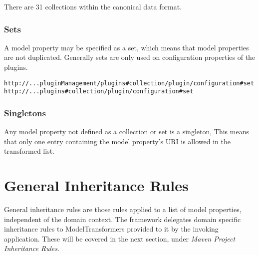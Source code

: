 \documentclass[12pt]{amsart}
\begin{document}
There are 31 collections within the canonical data format. 
   
\subsubsection{Sets}
A model property may  be specified as a set, which means that model properties are not duplicated. Generally sets are only used on configuration properties of the plugins.

\begin{verbatim}
http://...pluginManagement/plugins#collection/plugin/configuration#set
http://...plugins#collection/plugin/configuration#set
\end{verbatim}

\subsubsection{Singletons}
Any model property not defined as a collection or set is  a singleton, This means that only one entry containing the model property's URI is allowed in the transformed list.

\section{General Inheritance Rules}
General inheritance rules are those rules applied to a list of model properties, independent of the domain context. The framework delegates domain specific inheritance rules to ModelTransformers provided to it by the invoking application. These will be covered in the next section, under \emph{Maven Project Inheritance Rules}.
\end{document}
